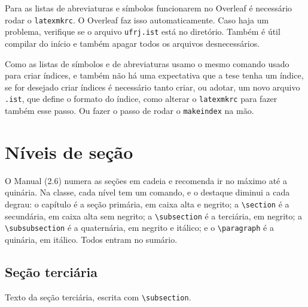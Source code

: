 \documentclass[dsc,setavermelha]{ufrj}
\theoremstyle{plain}
\theoremstyle{definition}
\theoremstyle{remark}
\begin{document}
  Para as listas de abreviaturas e símbolos funcionarem no Overleaf é necessário rodar o \verb|latexmkrc|. O Overleaf faz isso automaticamente. Caso haja um problema, verifique se o arquivo \verb|ufrj.ist| está no diretório. Também é útil compilar do início e também apagar todos os arquivos desnecessários.

  Como as listas de símbolos e de abreviaturas usamo o mesmo comando usado para criar índices, e também não há uma expectativa que a tese tenha um índice, se for desejado criar índices é necessário tanto criar, ou adotar, um novo arquivo \verb*|.ist|, que define o formato do índice, como alterar o \verb*|latexmkrc| para fazer também esse passo. Ou fazer o passo de rodar o \verb*|makeindex| na mão.

\section{Níveis de seção}
\label{sec:niveis}

O Manual (2.6) numera as seções em cadeia e recomenda ir no máximo até a quinária. Na classe, cada nível tem um comando, e o destaque diminui a cada degrau: o capítulo é a seção primária, em caixa alta e negrito; a \verb|\section| é a secundária, em caixa alta sem negrito; a \verb|\subsection| é a terciária, em negrito; a \verb|\subsubsection| é a quaternária, em negrito e itálico; e o \verb|\paragraph| é a quinária, em itálico. Todos entram no sumário.

\subsection{Seção terciária}

Texto da seção terciária, escrita com \verb|\subsection|.
\end{document}
